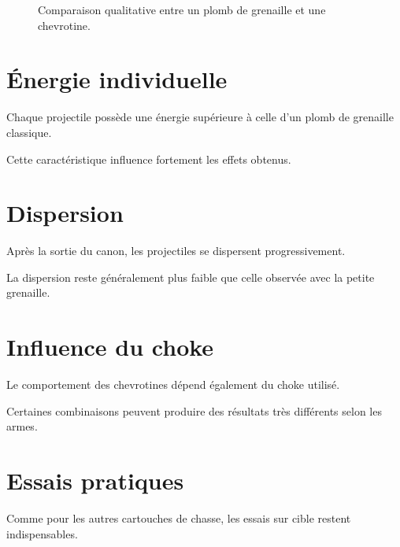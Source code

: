 \begin{figure}[htbp]
\centering


\caption{Comparaison qualitative entre un plomb de grenaille et une chevrotine.}
\label{fig:diametre_chevrotine}

\end{figure}

\section{Énergie individuelle}

Chaque projectile possède une énergie supérieure à celle d'un plomb de
grenaille classique.

Cette caractéristique influence fortement les effets obtenus.

\section{Dispersion}

Après la sortie du canon, les projectiles se dispersent progressivement.

La dispersion reste généralement plus faible que celle observée avec la petite
grenaille.

\section{Influence du choke}

Le comportement des chevrotines dépend également du choke utilisé.

Certaines combinaisons peuvent produire des résultats très différents selon les
armes.

\section{Essais pratiques}

Comme pour les autres cartouches de chasse, les essais sur cible restent
indispensables.

